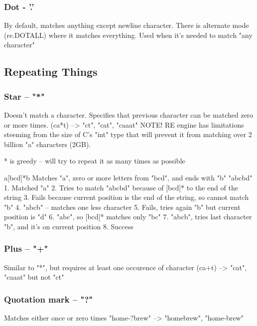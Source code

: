 \documentclass{beamer}
\begin{document}
\subsubsection{Dot - '.'}
\begin{frame}
By default, matches anything except newline character.
There is alternate mode (re.DOTALL) where it matches everything. Used when it's needed to match "any character"
\end{frame}

\subsection{Repeating Things}
\subsubsection{Star -- "*"}
\begin{frame}
Doesn't match a character. Specifies that previous character can be matched zero or more times.
(ca*t) --> "ct", "cat", "caaat"
NOTE! RE engine has limitations steeming from the size of C's "int" type that will prevent it from matching over 2 billion "a" characters (2GB).
\end{frame}

\begin{frame}
* is greedy -- will try to repeat it as many times as possible

a[bcd]*b
Matches "a", zero or more letters from "bcd", and ends with "b"
"abcbd"
1. Matched "a"
2. Tries to match "abcbd" because of [bcd]* to the end of the string
3. Fails because current position is the end of the string, so cannot match "b"
4. "abcb" -- matches one less character
5. Fails, tries again "b" but current position is "d"
6. "abc", so [bcd]* matches only "bc"
7. "abcb", tries last character "b", and it's on current position
8. Success
\end{frame}

\subsubsection{Plus -- "+"}
\begin{frame}
Similar to "*", but requires at least one occurence of character
(ca+t) --> "cat", "caaat" but not "ct"
\end{frame}

\subsubsection{Quotation mark -- "?"}
\begin{frame}
Matches either once or zero times
"home-?brew" --> "homebrew", "home-brew"
\end{frame}
\end{document}
